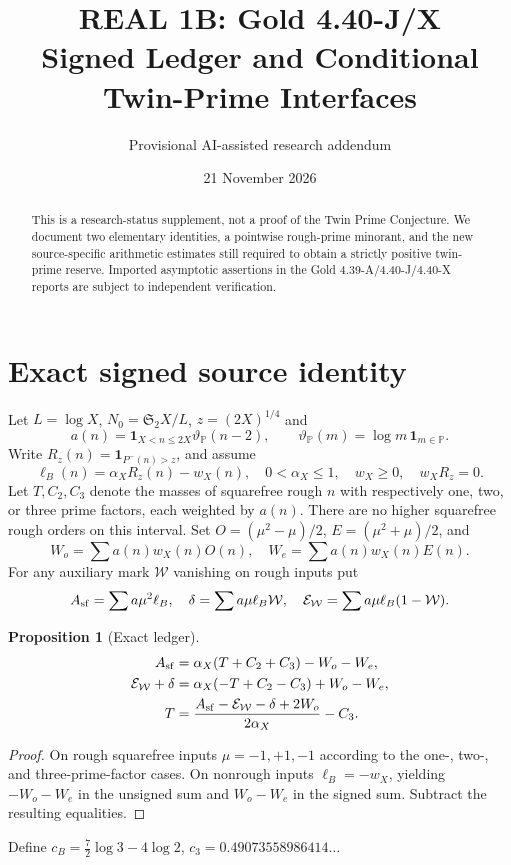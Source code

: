 \documentclass[11pt]{article}
\title{REAL 1B: Gold 4.40-J/X\\Signed Ledger and Conditional Twin-Prime Interfaces}
\author{Provisional AI-assisted research addendum}
\date{21 November 2026}
\newtheorem{proposition}{Proposition}
\begin{document}
\maketitle
\begin{abstract}
This is a research-status supplement, not a proof of the Twin Prime Conjecture.
We document two elementary identities, a pointwise rough-prime minorant,
and the new source-specific arithmetic estimates still required to obtain a
strictly positive twin-prime reserve. Imported asymptotic assertions in the
Gold 4.39-A/4.40-J/4.40-X reports are subject to independent verification.
\end{abstract}
\section{Exact signed source identity}
Let \(L=\log X\), \(N_0=\mathfrak S_2X/L\), \(z=(2X)^{1/4}\) and
\[
a(n)=\mathbf1_{X<n\le2X}\vartheta_{\mathbb P}(n-2),\qquad
\vartheta_{\mathbb P}(m)=\log m\,\mathbf1_{m\in\mathbb P}.
\]
Write \(R_z(n)=\mathbf1_{P^-(n)>z}\), and assume
\[
\ell_B(n)=\alpha_XR_z(n)-w_X(n),\quad
0<\alpha_X\le1,\quad w_X\ge0,\quad w_XR_z=0.
\]
Let \(T,C_2,C_3\) denote the masses of squarefree rough \(n\) with
respectively one, two, or three prime factors, each weighted by \(a(n)\).
There are no higher squarefree rough orders on this interval.
Set \(O=(\mu^2-\mu)/2\), \(E=(\mu^2+\mu)/2\), and
\[
W_o=\sum a(n)w_X(n)O(n),\quad W_e=\sum a(n)w_X(n)E(n).
\]
For any auxiliary mark \(\mathcal W\) vanishing on rough inputs put
\[
A_{\rm sf}=\sum a\mu^2\ell_B,\quad
\delta=\sum a\mu\ell_B\mathcal W,\quad
\mathcal E_{\mathcal W}=\sum a\mu\ell_B(1-\mathcal W).
\]
\begin{proposition}[Exact ledger]
\begin{align*}
A_{\rm sf}&=\alpha_X(T+C_2+C_3)-W_o-W_e,\\
\mathcal E_{\mathcal W}+\delta
 &=\alpha_X(-T+C_2-C_3)+W_o-W_e,\\
T&=\frac{A_{\rm sf}-\mathcal E_{\mathcal W}-\delta+2W_o}
 {2\alpha_X}-C_3.
\end{align*}
\end{proposition}
\begin{proof}
On rough squarefree inputs \(\mu=-1,+1,-1\) according to the
one-, two-, and three-prime-factor cases. On nonrough inputs
\(\ell_B=-w_X\), yielding \(-W_o-W_e\) in the unsigned sum and
\(W_o-W_e\) in the signed sum. Subtract the resulting equalities.
\end{proof}
Define \(c_B=\frac72\log3-4\log2\), \(c_3=0.49073558986414\ldots\)
\end{document}
